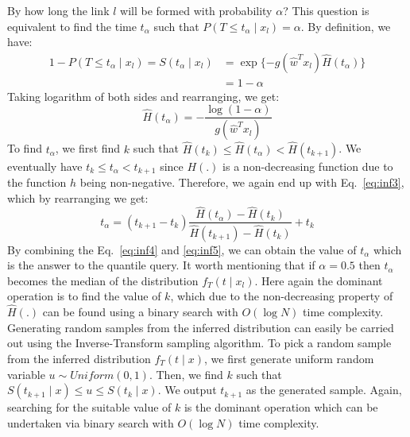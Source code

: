  By how long the link $l$ will be formed with probability $\alpha$? This question is equivalent to find the time $t_\alpha$ such that $P(T \le t_\alpha\mid x_l)=\alpha$. By definition, we have:
\begin{equation*}
\begin{split}
1-P(T \le t_\alpha\mid x_l)=S(t_\alpha\mid x_l)&=\exp\{-g(\hat{w}^Tx_l)\hat{H}(t_\alpha)\}\\
&=1-\alpha
\end{split}
\end{equation*}
Taking logarithm of both sides and rearranging, we get:
\begin{equation}\label{eq:inf4}
\hat{H}(t_\alpha)=-\frac{\log(1-\alpha)}{g(\hat{w}^Tx_l)}
\end{equation}
To find $t_\alpha$, we first find $k$ such that $\hat{H}(t_k)\le\hat{H}(t_\alpha)<\hat{H}(t_{k+1})$. We eventually have $t_k\le t_\alpha < t_{k+1}$ since $H(.)$ is a non-decreasing function due to the function $h$ being non-negative. Therefore, we again end up with Eq.~\ref{eq:inf3}, which by rearranging we get:
\begin{equation}\label{eq:inf5}
t_\alpha=(t_{k+1}-t_k)\frac{\hat{H}(t_\alpha)-\hat{H}(t_k)}{\hat{H}(t_{k+1})-\hat{H}(t_k)}+t_k
\end{equation}
By combining the Eq.~\ref{eq:inf4} and \ref{eq:inf5}, we can obtain the value of $t_\alpha$ which is the answer to the quantile query. It worth mentioning that if $\alpha=0.5$ then $t_\alpha$ becomes the median of the distribution $f_T(t\mid x_l)$. Here again the dominant operation is to find the value of $k$, which due to the non-decreasing property of $\hat{H}(.)$ can be found using a binary search with $O(\log N)$ time complexity.\\

Generating random samples from the inferred distribution can easily be carried out using the Inverse-Transform sampling algorithm. To pick a random sample from the inferred distribution $f_T(t\mid x)$, we first generate uniform random variable $u\sim Uniform(0,1)$. Then, we find $k$ such that $S(t_{k+1}\mid x)\leq u\le S(t_k\mid x)$. We output $t_{k+1}$ as the generated sample. Again, searching for the suitable value of $k$ is the dominant operation which can be undertaken via binary search with $O(\log N)$ time complexity.

